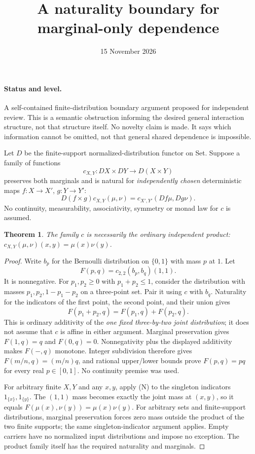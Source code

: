 \documentclass[11pt]{article}
\title{A naturality boundary for marginal-only dependence}
\date{15 November 2026}
\newtheorem{theorem}{Theorem}
\begin{document}
\maketitle
\paragraph{Status and level.} A self-contained finite-distribution boundary argument proposed for independent review. This is a semantic obstruction informing the desired general interaction structure, not that structure itself. No novelty claim is made. It says which information cannot be omitted, not that general shared dependence is impossible.

Let $D$ be the finite-support normalized-distribution functor on Set. Suppose a family of functions
\[
 c_{X,Y}:DX\times DY\longrightarrow D(X\times Y)
\]
preserves both marginals and is natural for \emph{independently chosen} deterministic maps $f:X\to X'$, $g:Y\to Y'$:
\[
 D(f\times g)c_{X,Y}(\mu,\nu)
   =c_{X',Y'}(Df\mu,Dg\nu).\tag{N}
\]
No continuity, measurability, associativity, symmetry or monad law for $c$ is assumed.

\begin{theorem}
The family $c$ is necessarily the ordinary independent product: $c_{X,Y}(\mu,\nu)(x,y)=\mu(x)\nu(y)$.
\end{theorem}
\begin{proof}
Write $b_p$ for the Bernoulli distribution on $\{0,1\}$ with mass $p$ at $1$. Let
\[
 F(p,q)=c_{2,2}(b_p,b_q)(1,1).
\]
It is nonnegative. For $p_1,p_2\ge0$ with $p_1+p_2\le1$, consider the distribution with masses $p_1,p_2,1-p_1-p_2$ on a three-point set. Pair it using $c$ with $b_q$. Naturality for the indicators of the first point, the second point, and their union gives
\[
 F(p_1+p_2,q)=F(p_1,q)+F(p_2,q).
\]
This is ordinary additivity of the \emph{one fixed three-by-two joint distribution}; it does not assume that $c$ is affine in either argument. Marginal preservation gives $F(1,q)=q$ and $F(0,q)=0$. Nonnegativity plus the displayed additivity makes $F(-,q)$ monotone. Integer subdivision therefore gives $F(m/n,q)=(m/n)q$, and rational upper/lower bounds prove $F(p,q)=pq$ for every real $p\in[0,1]$. No continuity premise was used.

For arbitrary finite $X,Y$ and any $x,y$, apply (N) to the singleton indicators $1_{\{x\}},1_{\{y\}}$. The $(1,1)$ mass becomes exactly the joint mass at $(x,y)$, so it equals $F(\mu(x),\nu(y))=\mu(x)\nu(y)$. For arbitrary sets and finite-support distributions, marginal preservation forces zero mass outside the product of the two finite supports; the same singleton-indicator argument applies. Empty carriers have no normalized input distributions and impose no exception. The product family itself has the required naturality and marginals.
\end{proof}
\end{document}
